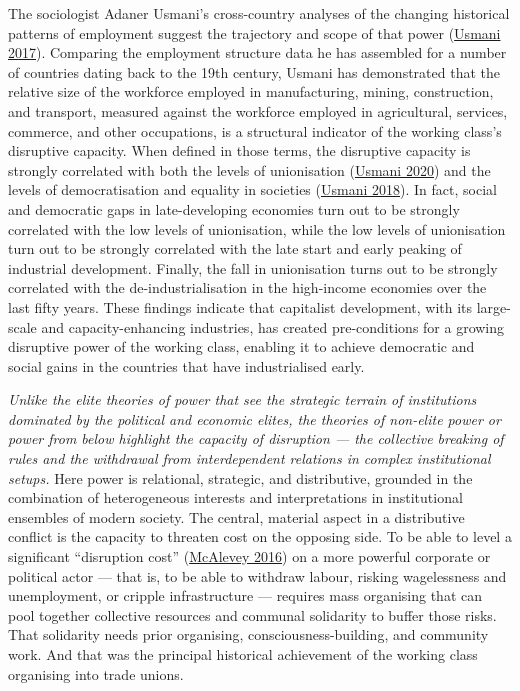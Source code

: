 \documentclass[a4paper, nobind]{templates/ociamthesis}
\begin{document}
The sociologist Adaner Usmani's cross-country analyses of the changing historical patterns of employment suggest the trajectory and scope of that power (\protect\hyperlink{ref-usmani_rise_2017}{Usmani 2017}). Comparing the employment structure data he has assembled for a number of countries dating back to the 19th century, Usmani has demonstrated that the relative size of the workforce employed in manufacturing, mining, construction, and transport, measured against the workforce employed in agricultural, services, commerce, and other occupations, is a structural indicator of the working class's disruptive capacity. When defined in those terms, the disruptive capacity is strongly correlated with both the levels of unionisation (\protect\hyperlink{ref-usmani_fortunes_2020}{Usmani 2020}) and the levels of democratisation and equality in societies (\protect\hyperlink{ref-usmani_democracy_2018}{Usmani 2018}). In fact, social and democratic gaps in late-developing economies turn out to be strongly correlated with the low levels of unionisation, while the low levels of unionisation turn out to be strongly correlated with the late start and early peaking of industrial development. Finally, the fall in unionisation turns out to be strongly correlated with the de-industrialisation in the high-income economies over the last fifty years. These findings indicate that capitalist development, with its large-scale and capacity-enhancing industries, has created pre-conditions for a growing disruptive power of the working class, enabling it to achieve democratic and social gains in the countries that have industrialised early.

\emph{Unlike the elite theories of power that see the strategic terrain of institutions dominated by the political and economic elites, the theories of non-elite power or power from below highlight the capacity of disruption --- the collective breaking of rules and the withdrawal from interdependent relations in complex institutional setups.} Here power is relational, strategic, and distributive, grounded in the combination of heterogeneous interests and interpretations in institutional ensembles of modern society. The central, material aspect in a distributive conflict is the capacity to threaten cost on the opposing side. To be able to level a significant ``disruption cost'' (\protect\hyperlink{ref-mcalevey_no_2016}{McAlevey 2016}) on a more powerful corporate or political actor --- that is, to be able to withdraw labour, risking wagelessness and unemployment, or cripple infrastructure --- requires mass organising that can pool together collective resources and communal solidarity to buffer those risks. That solidarity needs prior organising, consciousness-building, and community work. And that was the principal historical achievement of the working class organising into trade unions.
\end{document}
